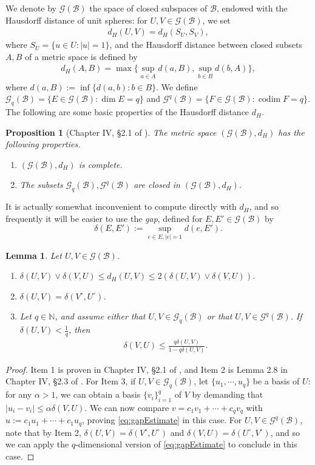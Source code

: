 \documentclass[11pt]{amsart}
\theoremstyle{theorem}
\newtheorem{lem}[thm]{Lemma}
\newtheorem{prop}[thm]{Proposition}
\theoremstyle{definition}
\numberwithin{equation}{section}
\newcommand{\N}{\mathbb{N}}
\newcommand{\Gc}{\mathcal{G}}
\renewcommand{\a}{\alpha}
\renewcommand{\d}{\delta}
\newcommand{\Bc}{\mathcal{B}}
\newcommand{\codim}{\operatorname{codim}}
\begin{document}
We denote by $\Gc(\Bc)$ the space of closed subspaces of $\Bc$, endowed with the Hausdorff distance of unit spheres: for $U, V \in \Gc(\Bc)$, we set
\begin{align}\label{eq:hausDist}
d_H(U, V) = d_H(S_U, S_V),
\end{align}
where $S_U = \{u \in U : |u| = 1\}$, and the Hausdorff distance between closed subsets $A, B$ of a metric space is defined by
\begin{align*}
d_H(A, B) = \max\{\sup_{a \in A} d(a, B), \sup_{b \in B} d(b, A) \},
\end{align*}
where $d(a, B) := \inf\{d(a,b) : b \in B\}$. We define $\Gc_q(\Bc) = \{E \in \Gc(\Bc) : \dim E = q\}$ and $\Gc^q(\Bc) = \{F \in \Gc(\Bc) : \codim F = q\}$. The following are some basic properties of the Hausdorff distance $d_H$.

\begin{prop}[Chapter IV, \S2.1 of \cite{K}] \label{prop:grassProps}
The metric space $(\Gc(\Bc), d_H)$ has the following properties.
\begin{enumerate}
\item $(\Gc(\Bc), d_H)$ is complete. 
\item The subsets $\Gc_q(\Bc), \Gc^q(\Bc)$ are closed in $(\Gc(\Bc), d_H)$.
\end{enumerate}
\end{prop}

It is actually somewhat inconvenient to compute directly with $d_H$, and so frequently it will be easier to use the \emph{gap}, defined for $E, E' \in \Gc(\Bc)$ by
\[
\d(E, E') := \sup_{e \in E, |e| = 1} d(e, E').
\]
\begin{lem} \label{lem:apertureProps}
Let $U, V \in \Gc(\Bc)$.
\begin{enumerate}
\item $\d(U, V) \vee \d(V, U) \leq d_H(U, V) \leq 2 (\d(U, V) \vee \d(V, U))$.
\item $\d(U, V) = \d(V^{\circ}, U^{\circ})$.
\item Let $q \in \N$, and assume either that $U, V \in \Gc_q(\Bc)$ or that $U, V \in \Gc^q(\Bc)$. If $\d(U, V) < \frac{1}{q}$, then
\begin{align}\label{eq:gapEstimate}
\d(V, U) \leq \frac{q \d(U, V)}{1 - q \d(U, V)}.
\end{align}
\end{enumerate}
\end{lem}
\begin{proof}
Item 1 is proven in Chapter IV, \S2.1 of \cite{K}, and Item 2 is Lemma 2.8 in Chapter IV, \S 2.3 of \cite{K}. For Item 3, if $U, V \in \Gc_q(\Bc)$, let $\{u_1, \cdots, u_q\}$ be a basis of $U$: for any $\a > 1$, we can obtain a basis $\{v_i\}_{i = 1}^q$ of $V$ by demanding that $|u_i - v_i| \leq \a \d(V, U)$. We can now compare $v = c_1 v_1 + \cdots + c_q v_q$ with $u := c_1 u_1 + \cdots + c_1 u_q$, proving \eqref{eq:gapEstimate} in this case. For $U, V \in \Gc^q(\Bc)$, note that by Item 2, $\d(U, V) = \d(V^{\circ}, U^{\circ})$ and $\d(V, U) = \d(U^{\circ}, V^{\circ})$, and so we can apply the $q$-dimensional version of \eqref{eq:gapEstimate} to conclude in this case.
\end{proof}
\end{document}
